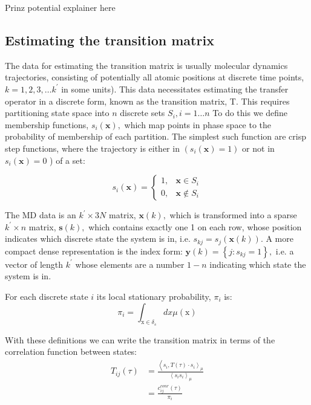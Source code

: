 Prinz potential explainer here


\subsection{Estimating the transition matrix}
The data for estimating the transition matrix is usually molecular dynamics trajectories, consisting of potentially all atomic positions at discrete time points, $k=1,2,3, \dots k^{\prime}$ in some units). This data necessitates estimating the transfer operator in a discrete form, known as the transition matrix, T. This requires partitioning state space into $n$ discrete sets $S_{i}, i=1 \ldots n$ To do this we define membership functions, $s_{i}(\mathbf{x}),$ which map points in phase space to the probability of membership of each partition. The simplest such function are crisp step functions, where the trajectory is either in $\left(s_{i}(\mathbf{x})=1\right)$ or not in $s_{i}(\mathbf{x})=0$ ) of a set:


\begin{equation}
s_{i}(\mathbf{x})=\left\{\begin{array}{ll}
1, & \mathbf{x} \in S_{i} \\
0, & \mathbf{x} \notin S_{i}
\end{array}\right.
\end{equation}

The MD data is an $k^{\prime} \times 3 N$ matrix, $\mathbf{x}(k),$ which is transformed into a sparse $k^{\prime} \times n$ matrix, $\mathbf{s}(k),$ which contains exactly one 1 on each row, whose position indicates which discrete state the system is in, i.e. $s_{k j}=s_{j}(\mathbf{x}(k)) .$ A more compact dense representation is the index form: $\mathbf{y}(k)=\left\{j: s_{k j}=1\right\},$ i.e. a vector of length $k^{\prime}$ whose elements are a number $1-n$ indicating which state the system is in.
 
 For each discrete state $i$ its local stationary probability, $\pi_{i}$ is:
\begin{equation}
\pi_{i}=\int_{\mathrm{x} \in \delta_{s}} d x \mu(\mathrm{x})
\end{equation}

With these definitions we can write the transition matrix in terms of the correlation function between states:
\begin{equation}
\begin{split}
T_{i j}(\tau) &= \frac{\left\langle s_{i},\left.T(\tau) \cdot s_{i}\right\rangle_{\mu}\right.}{\left\langle s_{i} s_{i}\right\rangle_{\mu}} \\
& =\frac{c_{i j}^{c o n r}(\tau)}{\pi_{i}}
\end{split}
\end{equation}


